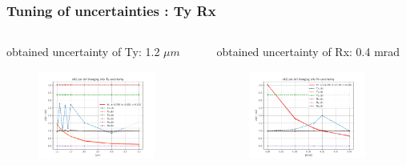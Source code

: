 \documentclass[aspectratio=1610, 12pt]{beamer}
\begin{document}
\begin{frame}\frametitle{Tuning of uncertainties : Ty Rx}
  \begin{columns}
    \begin{column}[c]{0.48\textwidth}
      obtained uncertainty of Ty: 1.2 $\mu m$
      \begin{figure}
        \includegraphics[width=0.9\textwidth]{plots/retest/Ty_with_set_Tx_full_fit.pdf}
      \end{figure}
    \end{column}
      \begin{column}[c]{0.48\textwidth}
        obtained uncertainty of Rx: 0.4 mrad
        \begin{figure}
          \includegraphics[width=0.9\textwidth]{plots/retest/Rx_with_set_TxTy_full_fit.pdf}
        \end{figure}
      \end{column}
  \end{columns}
\end{frame}
\end{document}
